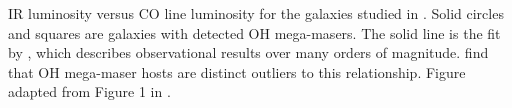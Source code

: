 \label{fig:ohm_IR_CO} IR luminosity versus CO line luminosity for the galaxies studied in \citet{Darling_2007}. Solid circles and squares are galaxies with detected OH mega-masers. The solid line is the fit by \citet{Gao_2004}, which describes observational results over many orders of magnitude. \citet{Darling_2007} find that OH mega-maser hosts are distinct outliers to this relationship. Figure adapted from Figure 1 in \citet{Darling_2007}. 